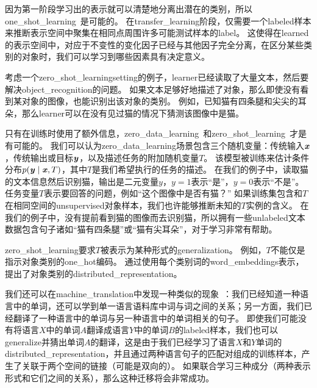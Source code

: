 
因为第一阶段学习出的表示就可以清楚地分离出潜在的类别，所以\gls{one_shot_learning}~\citep{Fei-Fei+al-2006}是可能的。
在\gls{transfer_learning}阶段，仅需要一个\gls{labeled}样本来推断表示空间中聚集在相同点周围许多可能测试样本的\gls{label}。
这使得在\gls{learned}的表示空间中，对应于不变性的变化因子已经与其他因子完全分离，在区分某些类别的对象时，我们可以学习到哪些因素具有决定意义。


考虑一个\gls{zero_shot_learning}\gls{setting}的例子，\gls{learner}已经读取了大量文本，然后要解决\gls{object_recognition}的问题。
如果文本足够好地描述了对象，那么即使没有看到某对象的图像，也能识别出该对象的类别。
例如，已知猫有四条腿和尖尖的耳朵，那么\gls{learner}可以在没有见过猫的情况下猜测该图像中是猫。



只有在训练时使用了额外信息，\gls{zero_data_learning}~\citep{Larochelle2008}和\gls{zero_shot_learning}~\citep{Palatucci2009,Socher-2013}才是有可能的。
我们可以认为\gls{zero_data_learning}场景包含三个随机变量：传统输入$\boldsymbol{\mathit{x}}$，传统输出或目标$\boldsymbol{\mathit{y}}$，以及描述任务的附加随机变量$T$。
该模型被训练来估计条件分布$p(\boldsymbol{\mathit{y}} \mid \boldsymbol{\mathit{x}}, T)$，其中$T$是我们希望执行的任务的描述。
在我们的例子中，读取猫的文本信息然后识别猫，输出是二元变量$y$，$y=1$表示``是''，$y=0$表示``不是''。
任务变量$T$表示要回答的问题，例如``这个图像中是否有猫？''
如果训练集包含和$T$在相同空间的\gls{unsupervised}对象样本，我们也许能够推断未知的$T$实例的含义。
在我们的例子中，没有提前看到猫的图像而去识别猫，所以拥有一些\gls{unlabeled}文本数据包含句子诸如``猫有四条腿''或``猫有尖耳朵''，对于学习非常有帮助。


\gls{zero_shot_learning}要求$T$被表示为某种形式的\gls{generalization}。
例如，$T$不能仅是指示对象类别的\gls{one_hot}编码。
通过使用每个类别词的\gls{word_embeddings}表示，\cite{Socher-2013}提出了对象类别的\gls{distributed_representation}。


我们还可以在\gls{machine_translation}中发现一种类似的现象~\citep{Klementiev-et-al-COLING2012,Mikolov-et-al-arxiv2013,Gouws-et-al-arxiv2014}：我们已经知道一种语言中的单词，还可以学到单一语言语料库中词与词之间的关系；另一方面，我们已经翻译了一种语言中的单词与另一种语言中的单词相关的句子。
即使我们可能没有将语言$X$中的单词$A$翻译成语言$Y$中的单词$B$的\gls{labeled}样本，我们也可以\gls{generalize}并猜出单词$A$的翻译，这是由于我们已经学习了语言$X$和$Y$单词的\gls{distributed_representation}，并且通过两种语言句子的匹配对组成的训练样本，产生了关联于两个空间的链接（可能是双向的）。
如果联合学习三种成分（两种表示形式和它们之间的关系），那么这种迁移将会非常成功。

